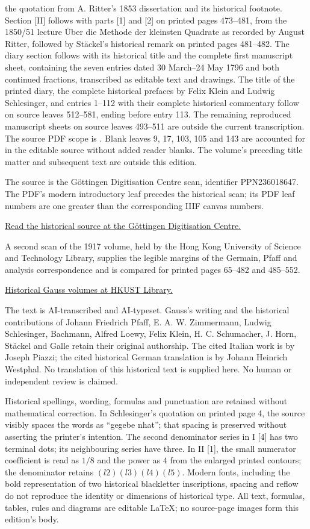the quotation from A. Ritter’s 1853 dissertation and its historical footnote. Section [II] follows with parts [1] and [2] on printed pages 473–481, from the 1850/51 lecture Über die Methode der kleinsten Quadrate as recorded by August Ritter, followed by Stäckel’s historical remark on printed pages 481–482. The diary section follows with its historical title and the complete first manuscript sheet, containing the seven entries dated 30 March–24 May 1796 and both continued fractions, transcribed as editable text and drawings. The title of the printed diary, the complete historical prefaces by Felix Klein and Ludwig Schlesinger, and entries 1–112 with their complete historical commentary follow on source leaves 512–581, ending before entry 113. The remaining reproduced manuscript sheets on source leaves 493–511 are outside the current transcription. The source PDF scope is \GaussXOneEditionScope. Blank leaves 9, 17, 103, 105 and 143 are accounted for in the editable source without added reader blanks. The volume's preceding title matter and subsequent text are outside this edition.

The source is the Göttingen Digitisation Centre scan, identifier PPN236018647. The PDF's modern introductory leaf precedes the historical scan; its PDF leaf numbers are one greater than the corresponding IIIF canvas numbers.

\noindent\href{https://gdz.sub.uni-goettingen.de/id/PPN236018647}{Read the historical source at the Göttingen Digitisation Centre.}

A second scan of the 1917 volume, held by the Hong Kong University of Science and Technology Library, supplies the legible margins of the Germain, Pfaff and analysis correspondence and is compared for printed pages 65–482 and 485–552.

\noindent\href{https://lbezone.hkust.edu.hk/rse/?p=13258}{Historical Gauss volumes at HKUST Library.}

The text is AI-transcribed and AI-typeset. Gauss's writing and the historical contributions of Johann Friedrich Pfaff, E. A. W. Zimmermann, Ludwig Schlesinger, Bachmann, Alfred Loewy, Felix Klein, H. C. Schumacher, J. Horn, Stäckel and Galle retain their original authorship. The cited Italian work is by Joseph Piazzi; the cited historical German translation is by Johann Heinrich Westphal. No translation of this historical text is supplied here. No human or independent review is claimed.

Historical spellings, wording, formulas and punctuation are retained without mathematical correction. In Schlesinger's quotation on printed page 4, the source visibly spaces the words as ``gegebe nhat''; that spacing is preserved without asserting the printer's intention. The second denominator series in I [4] has two terminal dots; its neighbouring series have three. In II [1], the small numerator coefficient is read as $1/8$ and the power as $4$ from the enlarged printed contours; the denominator retains $(l2)(l3)(l4)(l5)$. Modern fonts, including the bold representation of two historical blackletter inscriptions, spacing and reflow do not reproduce the identity or dimensions of historical type. All text, formulas, tables, rules and diagrams are editable LaTeX; no source-page images form this edition's body.

